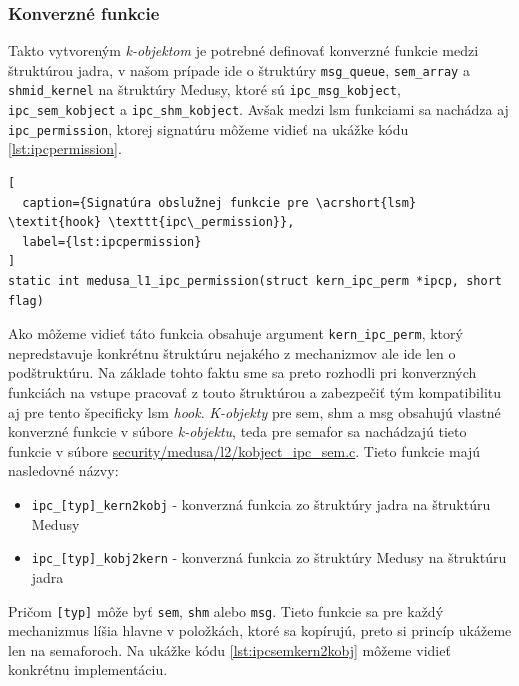 \subsubsection{Konverzné funkcie} \label{converse}
Takto vytvoreným \textit{k-objektom} je potrebné definovať konverzné funkcie medzi štruktúrou jadra, v našom prípade ide o štruktúry \texttt{msg\_queue}, \texttt{sem\_array} a \texttt{shmid\_kernel} na štruktúry Medusy, ktoré sú \texttt{ipc\_msg\_kobject}, \texttt{ipc\_sem\_kobject} a \texttt{ipc\_shm\_kobject}. Avšak medzi \acrshort{lsm} funkciami sa nachádza aj \texttt{ipc\_permission}, ktorej signatúru môžeme vidieť na ukážke kódu \ref{lst:ipcpermission}.
\begin{lstlisting}[
  caption={Signatúra obslužnej funkcie pre \acrshort{lsm} \textit{hook} \texttt{ipc\_permission}},
  label={lst:ipcpermission}
]
static int medusa_l1_ipc_permission(struct kern_ipc_perm *ipcp, short flag)
\end{lstlisting}
Ako môžeme vidieť táto funkcia obsahuje argument \texttt{kern\_ipc\_perm}, ktorý nepredstavuje konkrétnu štruktúru nejakého z mechanizmov ale ide len o podštruktúru. Na základe tohto faktu sme sa preto rozhodli pri konverzných funkciách na vstupe pracovať z touto štruktúrou a zabezpečiť tým kompatibilitu aj pre tento špecificky \acrshort{lsm} \textit{hook}. \textit{K-objekty} pre \acrshort{sem}, \acrshort{shm} a \acrshort{msg} obsahujú vlastné konverzné funkcie v súbore \textit{k-objektu}, teda pre semafor sa nachádzajú tieto funkcie v súbore \url{security/medusa/l2/kobject_ipc_sem.c}. Tieto funkcie majú nasledovné názvy:
\begin{itemize}
\item \texttt{ipc\_[typ]\_kern2kobj} - konverzná funkcia zo štruktúry jadra na štruktúru Medusy
\item \texttt{ipc\_[typ]\_kobj2kern} - konverzná funkcia zo štruktúry Medusy na štruktúru jadra
\end{itemize}
Pričom \texttt{[typ]} môže byť \texttt{sem}, \texttt{shm} alebo \texttt{msg}. Tieto funkcie sa pre každý mechanizmus líšia hlavne v položkách, ktoré sa kopírujú, preto si princíp ukážeme len na semaforoch. Na ukážke kódu \ref{lst:ipcsemkern2kobj} môžeme vidieť konkrétnu implementáciu. 
